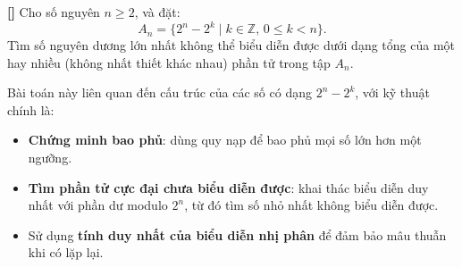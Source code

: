 \documentclass[../01-divisibility.tex]{subfiles}
\begin{document}
\begin{example*}\label{example:IND-2015-TST2-P1}\textbf{[]}\footnotemark
	Cho số nguyên \( n \geq 2 \), và đặt:
	\[
		A_n = \{2^n - 2^k \mid k \in \mathbb{Z},\, 0 \leq k < n \}.
	\]
	Tìm số nguyên dương lớn nhất không thể biểu diễn được dưới dạng tổng của một hay nhiều (không nhất thiết khác nhau) phần tử trong tập \( A_n \).
\end{example*}

\begin{story*}
	Bài toán này liên quan đến cấu trúc của các số có dạng \( 2^n - 2^k \), với kỹ thuật chính là:
	\begin{itemize}[topsep=0pt, partopsep=0pt, itemsep=0pt]
	    \item \textbf{Chứng minh bao phủ}: dùng quy nạp để bao phủ mọi số lớn hơn một ngưỡng.
	    \item \textbf{Tìm phần tử cực đại chưa biểu diễn được}: khai thác biểu diễn duy nhất với phần dư modulo \( 2^n \), từ đó tìm số nhỏ nhất không biểu diễn được.
	    \item Sử dụng \textbf{tính duy nhất của biểu diễn nhị phân} để đảm bảo mâu thuẫn khi có lặp lại.
	\end{itemize}
\end{story*}

\bigbreak
\end{document}
